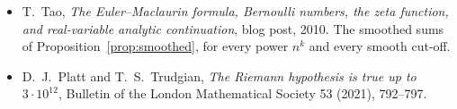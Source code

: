 \begin{itemize}
83--89. E.~Wirsing, \emph{On the theorem of Gauss--Kusmin--L\'evy and a Frobenius-type theorem for function spaces}, Acta
Arithmetica 24 (1974), 507--528.
\item T.~Tao, \emph{The Euler--Maclaurin formula, Bernoulli numbers, the zeta function, and real-variable analytic continuation},
blog post, 2010. The smoothed sums of Proposition~\ref{prop:smoothed}, for every power $n^k$ and every smooth cut-off.
\item D.~J.~Platt and T.~S.~Trudgian, \emph{The Riemann hypothesis is true up to $3\cdot10^{12}$}, Bulletin of the London Mathematical
Society 53 (2021), 792--797.
\end{itemize}
